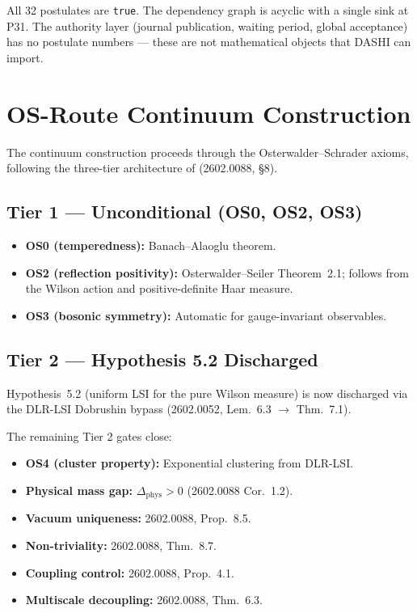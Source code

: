 \documentclass[11pt,a4paper]{article}
\begin{document}
All 32 postulates are \texttt{true}.  The dependency graph is acyclic with a
single sink at P31.  The authority layer (journal publication, waiting period,
global acceptance) has no postulate numbers --- these are not mathematical
objects that DASHI can import.

\section{OS-Route Continuum Construction}

The continuum construction proceeds through the Osterwalder--Schrader axioms,
following the three-tier architecture of (2602.0088, \S8).

\subsection{Tier 1 --- Unconditional (OS0, OS2, OS3)}

\begin{itemize}
\item \textbf{OS0 (temperedness):} Banach--Alaoglu theorem.
\item \textbf{OS2 (reflection positivity):} Osterwalder--Seiler Theorem~2.1;
  follows from the Wilson action and positive-definite Haar measure.
\item \textbf{OS3 (bosonic symmetry):} Automatic for gauge-invariant
  observables.
\end{itemize}

\subsection{Tier 2 --- Hypothesis 5.2 Discharged}

Hypothesis~5.2 (uniform LSI for the pure Wilson measure) is now discharged
via the DLR-LSI Dobrushin bypass (2602.0052, Lem.~6.3 $\rightarrow$ Thm.~7.1).

The remaining Tier 2 gates close:
\begin{itemize}
\item \textbf{OS4 (cluster property):} Exponential clustering from DLR-LSI.
\item \textbf{Physical mass gap:} $\Delta_{\mathrm{phys}} > 0$ (2602.0088
  Cor.~1.2).
\item \textbf{Vacuum uniqueness:} 2602.0088, Prop.~8.5.
\item \textbf{Non-triviality:} 2602.0088, Thm.~8.7.
\item \textbf{Coupling control:} 2602.0088, Prop.~4.1.
\item \textbf{Multiscale decoupling:} 2602.0088, Thm.~6.3.
\end{itemize}
\end{document}
